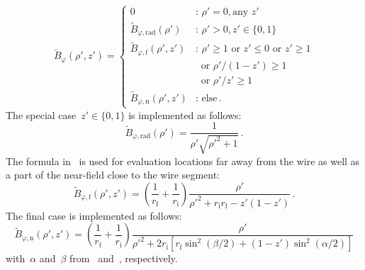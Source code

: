 \begin{equation}
  \tilde{B}_\varphi (\rho', z') =
  \begin{cases}
    0                                            &:\, \rho' = 0 , \textrm{any } z'      \\
    \tilde{B}_{\varphi,\mathrm{rad}} (\rho')     &:\, \rho' > 0, z' \in \{0, 1\} \\
    \tilde{B}_{\varphi,\mathrm{f}}   (\rho', z') &:\, \rho' \geq 1 \textrm{ or } z' \leq 0 \textrm{ or } z' \geq 1 \\
                                            ~    & ~ \textrm{ or } \rho'/(1-z') \geq 1  \\
                                            ~    & ~ \textrm{ or } \rho'/z'   \geq 1 \\
    \tilde{B}_{\varphi,\mathrm{n}}   (\rho', z') &:\, \textrm{else} \, .
  \end{cases} \label{eqn:sws_B_phi_switchover}
\end{equation}
The special case~$z' \in \{0, 1\}$ is implemented as follows:
\begin{equation}
  \tilde{B}_{\varphi,\mathrm{rad}} (\rho') = \frac{1}{\rho' \sqrt{{\rho'}^2 + 1}} \, .
\end{equation}
The formula in~ is used for evaluation locations far away from the wire
as well as a part of the near-field close to the wire segment:
\begin{equation}
  \tilde{B}_{\varphi,\mathrm{f}} (\rho', z')
  = \left(\frac{1}{r_\mathrm{f}} + \frac{1}{r_\mathrm{i}} \right)
    \frac{\rho'}{{\rho'}^2 + r_\mathrm{i} r_\mathrm{f} - z' (1 - z')} \, .
\end{equation}
The final case is implemented as follows:
\begin{equation}
  \tilde{B}_{\varphi,\mathrm{n}} (\rho', z')
  = \left(\frac{1}{r_\mathrm{f}} + \frac{1}{r_\mathrm{i}} \right)
    \frac{\rho'}
         {{\rho'}^2 + 2 r_\mathrm{i} \left[ r_\mathrm{f} \sin^2(\beta/2) + (1 - z') \sin^2(\alpha/2) \right]}
\end{equation}
with~$\alpha$ and~$\beta$ from~ and~, respectively.

